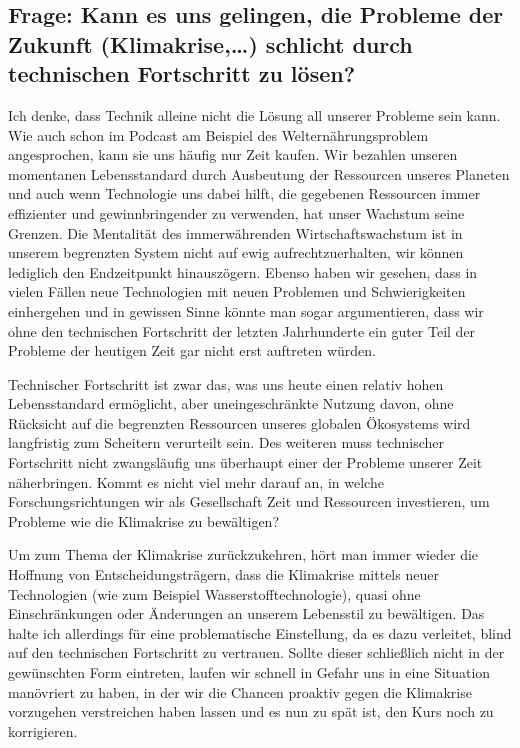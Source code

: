 \documentclass[twoside, a4paper, DIV=11, open=any, bibliography=totoc]{scrbook}
\begin{document}
\subsection{Frage: Kann es uns gelingen, die Probleme der Zukunft (Klimakrise,\dots)
schlicht durch technischen Fortschritt zu lösen?}

Ich denke, dass Technik alleine nicht die Lösung all unserer Probleme sein kann.
Wie auch schon im Podcast am Beispiel des Welternährungsproblem angesprochen,
kann sie uns häufig nur Zeit kaufen. Wir bezahlen unseren momentanen Lebensstandard
durch Ausbeutung der Ressourcen unseres Planeten und auch wenn Technologie uns dabei
hilft, die gegebenen Ressourcen immer effizienter und gewinnbringender zu verwenden,
hat unser Wachstum seine Grenzen.
Die Mentalität des immerwährenden Wirtschaftswachstum
ist in unserem begrenzten System nicht auf ewig aufrechtzuerhalten, wir können
lediglich den Endzeitpunkt hinauszögern. Ebenso haben wir gesehen, dass in vielen Fällen
neue Technologien mit neuen Problemen und Schwierigkeiten einhergehen und in gewissen
Sinne könnte man sogar argumentieren, dass wir ohne den technischen Fortschritt
der letzten Jahrhunderte ein guter Teil der Probleme der heutigen Zeit gar nicht
erst auftreten würden.


Technischer Fortschritt ist zwar das, was uns heute einen relativ hohen Lebensstandard ermöglicht,
aber uneingeschränkte Nutzung davon, ohne Rücksicht auf die begrenzten Ressourcen
unseres globalen Ökosystems wird langfristig zum Scheitern verurteilt sein.
Des weiteren muss technischer Fortschritt nicht zwangsläufig uns überhaupt einer
 der Probleme unserer Zeit näherbringen. Kommt es nicht viel mehr
darauf an, in welche Forschungsrichtungen wir als Gesellschaft Zeit und Ressourcen
investieren, um Probleme wie die Klimakrise zu bewältigen?


Um zum Thema der Klimakrise zurückzukehren, hört man immer wieder die Hoffnung
von Entscheidungsträgern, dass die Klimakrise mittels neuer Technologien
(wie zum Beispiel Wasserstofftechnologie), quasi ohne
Einschränkungen oder Änderungen an unserem Lebensstil zu bewältigen.
Das halte ich allerdings für eine problematische Einstellung, da es dazu
verleitet, blind auf den technischen Fortschritt zu vertrauen.
Sollte dieser schließlich nicht in der gewünschten Form eintreten, laufen wir schnell
in Gefahr uns in eine Situation manövriert zu haben, in der wir die Chancen proaktiv
gegen die Klimakrise vorzugehen verstreichen haben lassen und es nun zu spät ist,
den Kurs noch zu korrigieren.
\end{document}
